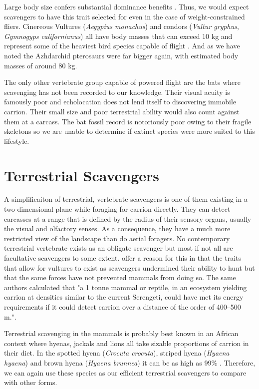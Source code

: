 \documentclass[a4paper,12pt]{article}
\begin{document}
Large body size confers substantial dominance benefits \citep{ruxton2004obligate}. Thus, we would expect scavengers to have this trait selected for even in the case of weight-constrained fliers. Cinereous Vultures (\textit{Aegypius monachus}) and condors (\textit{Vultur gryphus}, \textit{Gymnogyps californianus}) all have body masses that can exceed 10 kg and represent some of the heaviest bird species capable of flight \citep{ferguson2001raptors,donazar2002effects}. And as we have noted the Azhdarchid pterosaurs were far bigger again, with estimated body masses of around 80 kg. 
 
The only other vertebrate group capable of powered flight are the bats where scavenging has not been recorded to our knowledge. Their visual acuity is famously poor and echolocation does not lend itself to discovering immobile carrion. Their small size and poor terrestrial ability would also count against them at a carcass. The bat fossil record is notoriously poor owing to their fragile skeletons so we are unable to determine if extinct species were more suited to this lifestyle. 

\section*{Terrestrial Scavengers}
A simplificaiton of terrestrial, vertebrate scavengers is one of them existing in a two-dimensional plane while foraging for carrion directly. They can detect carcasses at a range that is defined by the radius of their sensory organs, usually the visual and olfactory senses. As a consequence, they have a much more restricted view of the landscape than do aerial foragers. No contemporary terrestrial vertebrate exists as an obligate scavenger but most if not all are facultative scavengers to some extent. \cite{ruxton2004obligate} offer a reason for this in that the traits that allow for vultures to exist as scavengers undermined their ability to hunt but that the same forces have not prevented mammals from doing so. The same authors calculated that "a 1 tonne mammal or reptile, in an ecosystem yielding carrion at densities similar to the current Serengeti, could have met its energy requirements if it could detect carrion over a distance of the order of 400–500 m."\citep{ruxton2004obligate}. 

Terrestrial scavenging in the mammals is probably best known in an African context where hyenas, jackals and lions all take sizable proportions of carrion in their diet. In the spotted hyena (\textit{Crocuta crocuta}), striped hyena (\textit{Hyaena hyaena}) and brown hyena (\textit{Hyaena brunnea}) it can be as high as 99\% \citep{benbow2015introduction}. Therefore, we can again use these species as our efficient terrestrial scavengers to compare with other forms. 
\end{document}
